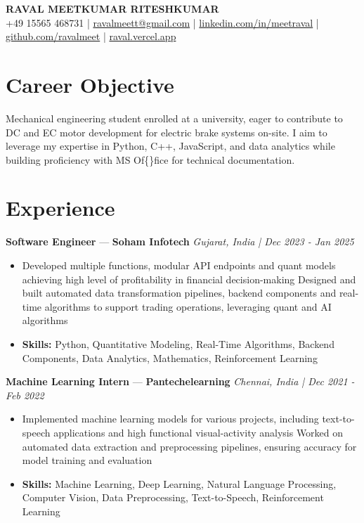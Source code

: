 \documentclass[a4paper,10pt]{article}
\begin{document}
\begin{center}
  {\Large\bfseries RAVAL MEETKUMAR RITESHKUMAR}\\[2pt]
  {\small +49 15565 468731 \;|\; \href{mailto:ravalmeett@gmail.com}{ravalmeett@gmail.com} \;|\; \href{https://www.linkedin.com/in/meetraval/}{linkedin.com/in/meetraval} \;|\; \href{https://github.com/ravalmeet}{github.com/ravalmeet} \;|\; \href{https://raval.vercel.app/}{raval.vercel.app}}
\end{center}
\vspace{-3pt}

\section*{Career Objective}
Mechanical engineering student enrolled at a university, eager to contribute to DC and EC motor development for electric brake systems on-site. I aim to leverage my expertise in Python, C++, JavaScript, and data analytics while building proficiency with MS Of\{\}fice for technical documentation.\par

\section*{Experience}
\textbf{Software Engineer} — \textbf{Soham Infotech} \hfill \textit{Gujarat, India \;|\; Dec 2023 - Jan 2025}\par
\vspace{1pt}
\begin{itemize}
  \item Developed multiple functions, modular API endpoints and quant models achieving high level of profitability in financial decision-making Designed and built automated data transformation pipelines, backend components and real-time algorithms to support trading operations, leveraging quant and AI algorithms
  \item \textbf{Skills:} Python, Quantitative Modeling, Real-Time Algorithms, Backend Components, Data Analytics, Mathematics, Reinforcement Learning
\end{itemize}
\vspace{3pt}
\textbf{Machine Learning Intern} — \textbf{Pantechelearning} \hfill \textit{Chennai, India \;|\; Dec 2021 - Feb 2022}\par
\vspace{1pt}
\begin{itemize}
  \item Implemented machine learning models for various projects, including text-to-speech applications and high functional visual-activity analysis Worked on automated data extraction and preprocessing pipelines, ensuring accuracy for model training and evaluation
  \item \textbf{Skills:} Machine Learning, Deep Learning, Natural Language Processing, Computer Vision, Data Preprocessing, Text-to-Speech, Reinforcement Learning
\end{itemize}
\end{document}
